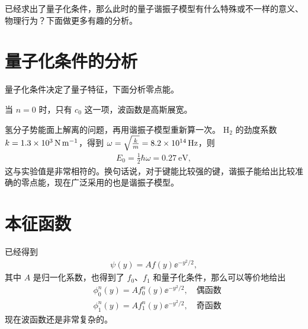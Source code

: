 
已经求出了量子化条件，那么此时的量子谐振子模型有什么特殊或不一样的意义、物理行为？下面做更多有趣的分析。

\section{量子化条件的分析}

量子化条件决定了量子特征，下面分析零点能。


当 $n=0$ 时，只有 $c_0$ 这一项，波函数是高斯展宽。

氢分子势能面上解离的问题，再用谐振子模型重新算一次。
$\mathrm H_2$ 的劲度系数 $k = \SI{1.3E3}{\newton\per\metre}$，得到 $\omega = \sqrt{\frac km} = \SI{8.2E14}{\hertz}$，则
\begin{eqnarray}
    E_0 = \frac 12 \hbar \omega = \SI{0.27}{\electronvolt}, 
\end{eqnarray}
这与实验值是非常相符的。换句话说，对于键能比较强的键，谐振子能给出比较准确的零点能，现在广泛采用的也是谐振子模型。

\section{本征函数}
已经得到
\begin{align}
    \psi(y) = A f(y) \ee^{-y^2/2},
\end{align}
其中 $A$ 是归一化系数，也得到了 $f_0$、$f_1$ 和量子化条件，那么可以等价地给出
\begin{align}
    &\phi_0^n (y) = A f_0^n (y) \ee^{-y^2/2}, \quad\text{偶函数}\\
    &\phi_1^n (y) = A f_1^n (y) \ee^{-y^2/2}, \quad\text{奇函数}
\end{align}
现在波函数还是非常复杂的。


